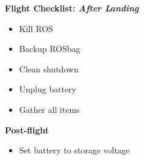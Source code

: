 \documentclass[]{auvsi_doc}
\begin{document}
\hrulefill

\textbf{Flight Checklist: \textit{After Landing}}
\begin{itemize}
	\item Kill ROS
	\item Backup ROSbag
	\item Clean shutdown
	\item Unplug battery
	\item Gather all items
\end{itemize}

\hrulefill

\textbf{Post-flight}
\begin{itemize}
	\item Set battery to storage voltage
\end{itemize}
\end{document}
